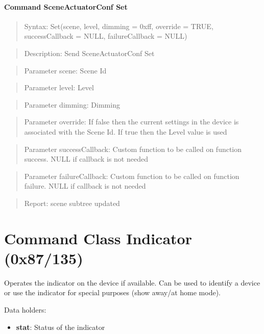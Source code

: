 \paragraph{Command SceneActuatorConf Set}
\begin{quote}Syntax: Set(scene, level, dimming = 0xff, override = TRUE, successCallback = NULL, failureCallback = NULL)\end{quote}
\begin{quote}Description: Send SceneActuatorConf Set\end{quote}
\begin{quote}Parameter scene: Scene Id\end{quote}
\begin{quote}Parameter level: Level\end{quote}
\begin{quote}Parameter dimming: Dimming\end{quote}
\begin{quote}Parameter override: If false then the current settings in the device is associated with the Scene Id. If true then the Level value is used\end{quote}
\begin{quote}Parameter successCallback: Custom function to be called on function success. NULL if callback is not needed\end{quote}
\begin{quote}Parameter failureCallback: Custom function to be called on function failure. NULL if callback is not needed\end{quote}
\begin{quote}Report: scene subtree updated\end{quote}


\section{Command Class Indicator (0x87/135)}

Operates the indicator on the device if available. Can be used to identify a device or use the indicator for special purposes (show away/at home mode).
\newline

\noindent
Data holders:

\begin{itemize}
\item \textbf{stat}: Status of the indicator
\end{itemize}


